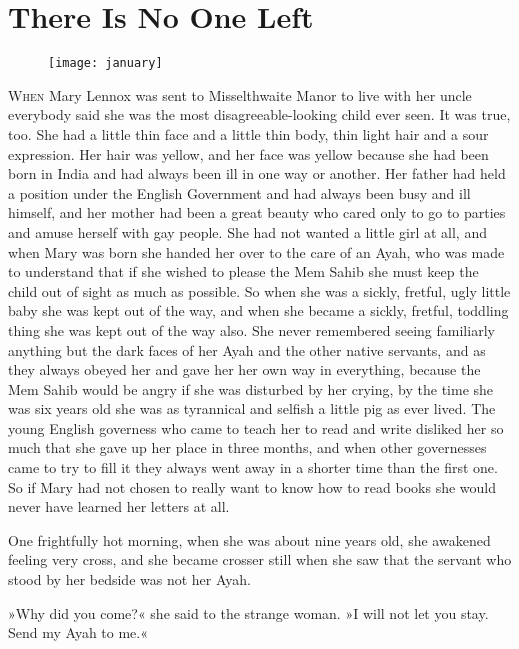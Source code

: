 \chapter{There Is No One Left}
	
\begin{figure}[t!]
\centering
\texttt{[image: january]}
\end{figure}

 \lettrine[lines=6]{W}{hen} Mary Lennox was sent to Misselthwaite Manor to live with her uncle everybody said she was the most dis\-agree\-able-looking child ever seen. It was true, too. She had a little thin face and a little thin body, thin light hair and a sour expression. Her hair was yellow, and her face was yellow because she had been born in India and had always been ill in one way or another. Her father had held a position under the English Government and had always been busy and ill himself, and her mother had been a great beauty who cared only to go to parties and amuse herself with gay people. She had not wanted a little girl at all, and when Mary was born she handed her over to the care of an Ayah, who was made to understand that if she wished to please the Mem Sahib she must keep the child out of sight as much as possible. So when she was a sickly, fretful, ugly little baby she was kept out of the way, and when she became a sickly, fretful, toddling thing she was kept out of the way also. She never remembered seeing familiarly anything but the dark faces of her Ayah and the other native servants, and as they always obeyed her and gave her her own way in everything, because the Mem Sahib would be angry if she was disturbed by her crying, by the time she was six years old she was as tyrannical and selfish a little pig as ever lived. The young English governess who came to teach her to read and write disliked her so much that she gave up her place in three months, and when other governesses came to try to fill it they always went away in a shorter time than the first one. So if Mary had not chosen to really want to know how to read books she would never have learned her letters at all.

One frightfully hot morning, when she was about nine years old, she awakened feeling very cross, and she became crosser still when she saw that the servant who stood by her bedside was not her Ayah.

»Why did you come?« she said to the strange woman. »I will not let you stay. Send my Ayah to me.«

